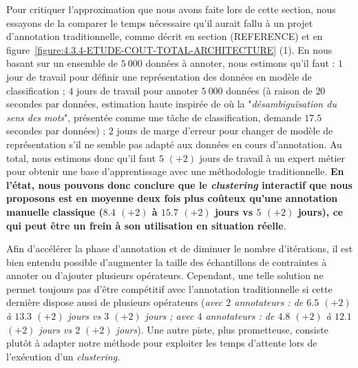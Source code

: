 			Pour critiquer l'approximation que nous avons faite lors de cette section, nous essayons de la comparer le temps nécessaire qu'il aurait fallu à un projet d'annotation traditionnelle, comme décrit en section (REFERENCE) et en figure~\ref{figure:4.3.4-ETUDE-COUT-TOTAL-ARCHITECTURE} (1).
			En nous basant sur un ensemble de $5~000$ données à annoter, nous estimons qu'il faut :
			$1$ jour de travail pour définir une représentation des données en modèle de classification ;
			$4$ jours de travail pour annoter $5~000$ données (à raison de $20$ secondes par données, estimation haute inspirée de \cite{pradhan-etal:2007:semeval2007-task-17} où la "\textit{désambiguïsation du sens des mots}", présentée comme une tâche de classification, demande $17.5$ secondes par données) ;
			$2$ jours de marge d'erreur pour changer de modèle de représentation s'il ne semble pas adapté aux données en cours d'annotation.
			Au total, nous estimons donc qu'il faut $5$ {\footnotesize $(+2)$} jours de travail à un expert métier pour obtenir une base d'apprentissage avec une méthodologie traditionnelle.
			\textbf{En l'état, nous pouvons donc conclure que le \textit{clustering} interactif que nous proposons est en moyenne deux fois plus coûteux qu'une annotation manuelle classique ($8.4$ {\footnotesize $(+2)$} à $15.7$ {\footnotesize $(+2)$} jours vs $5$ {\footnotesize $(+2)$} jours), ce qui peut être un frein à son utilisation en situation réelle}.
			
			Afin d'accélérer la phase d'annotation et de diminuer le nombre d'itérations, il est bien entendu possible d'augmenter la taille des échantillons de contraintes à annoter ou d'ajouter plusieurs opérateurs.
			Cependant, une telle solution ne permet toujours pas d'être compétitif avec l'annotation traditionnelle si cette dernière dispose aussi de plusieurs opérateurs (\textit{avec $2$ annotateurs : de $6.5$ {\footnotesize $(+2)$} à $13.3$ {\footnotesize $(+2)$} jours vs $3$ {\footnotesize $(+2)$} jours ; avec $4$ annotateurs : de $4.8$ {\footnotesize $(+2)$} à $12.1$ {\footnotesize $(+2)$} jours vs $2$ {\footnotesize $(+2)$} jours}).
			Une autre piste, plus prometteuse, consiste plutôt à adapter notre méthode pour exploiter les temps d'attente lors de l'exécution d'un \textit{clustering}.
			

